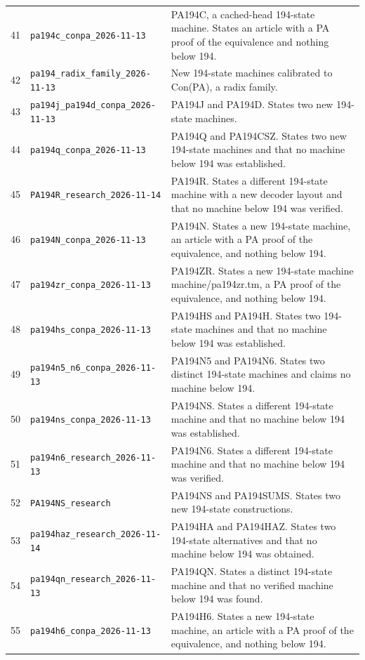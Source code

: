 \begin{longtable}{@{}rp{}p{}@{}}
41 & \nolinkurl{pa194c_conpa_2026-11-13} & PA194C, a cached-head 194-state machine. States an article with a PA proof of the equivalence and nothing below 194.\\[5pt]
42 & \nolinkurl{pa194_radix_family_2026-11-13} & New 194-state machines calibrated to Con(PA), a radix family.\\[5pt]
43 & \nolinkurl{pa194j_pa194d_conpa_2026-11-13} & PA194J and PA194D. States two new 194-state machines.\\[5pt]
44 & \nolinkurl{pa194q_conpa_2026-11-13} & PA194Q and PA194CSZ. States two new 194-state machines and that no machine below 194 was established.\\[5pt]
45 & \nolinkurl{PA194R_research_2026-11-14} & PA194R. States a different 194-state machine with a new decoder layout and that no machine below 194 was verified.\\[5pt]
46 & \nolinkurl{pa194N_conpa_2026-11-13} & PA194N. States a new 194-state machine, an article with a PA proof of the equivalence, and nothing below 194.\\[5pt]
47 & \nolinkurl{pa194zr_conpa_2026-11-13} & PA194ZR. States a new 194-state machine machine/pa194zr.tm, a PA proof of the equivalence, and nothing below 194.\\[5pt]
48 & \nolinkurl{pa194hs_conpa_2026-11-13} & PA194HS and PA194H. States two 194-state machines and that no machine below 194 was established.\\[5pt]
49 & \nolinkurl{pa194n5_n6_conpa_2026-11-13} & PA194N5 and PA194N6. States two distinct 194-state machines and claims no machine below 194.\\[5pt]
50 & \nolinkurl{pa194ns_conpa_2026-11-13} & PA194NS. States a different 194-state machine and that no machine below 194 was established.\\[5pt]
51 & \nolinkurl{pa194n6_research_2026-11-13} & PA194N6. States a different 194-state machine and that no machine below 194 was verified.\\[5pt]
52 & \nolinkurl{PA194NS_research} & PA194NS and PA194SUMS. States two new 194-state constructions.\\[5pt]
53 & \nolinkurl{pa194haz_research_2026-11-14} & PA194HA and PA194HAZ. States two 194-state alternatives and that no machine below 194 was obtained.\\[5pt]
54 & \nolinkurl{pa194qn_research_2026-11-13} & PA194QN. States a distinct 194-state machine and that no verified machine below 194 was found.\\[5pt]
55 & \nolinkurl{pa194h6_conpa_2026-11-13} & PA194H6. States a new 194-state machine, an article with a PA proof of the equivalence, and nothing below 194.\\[5pt]

\end{longtable}
